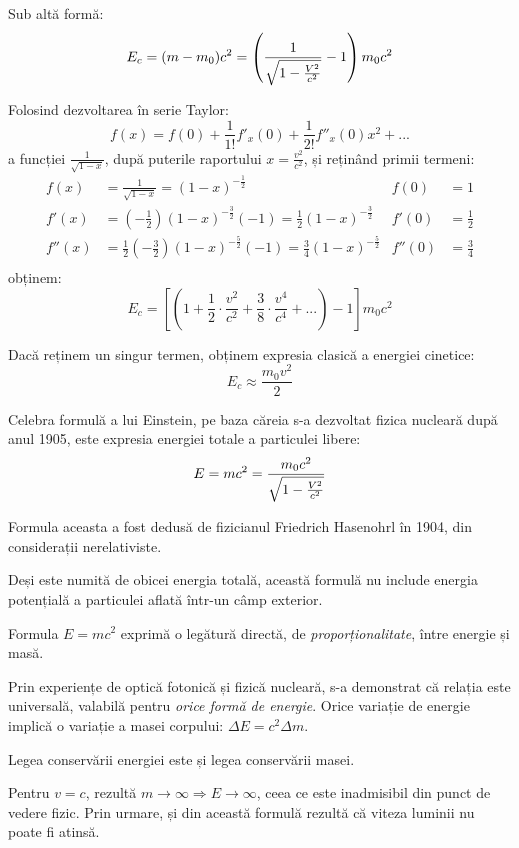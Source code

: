 Sub altă formă:
\[ E_c = (m - m_0) c^2 = \left( \frac{1}{\sqrt{1 - \frac{V^2}{c^2}}} - 1 \right) m_0c^2 \]

Folosind dezvoltarea în serie Taylor:
\[ f(x) = f(0) + \frac{1}{1!}f'_x(0) + \frac{1}{2!}f''_x(0) x^2 + ...\]
a funcției \( \frac{1}{\sqrt{1-x}} \), după puterile raportului \( x = \frac{v^2}{c^2} \),
și reținând primii termeni:
\begin{align*}
    f(x)   &= \frac{1}{\sqrt{1-x}} = (1 - x)^{-\frac{1}{2}}
           & f(0)   &= 1 \\
    f'(x)  &= \left(-\frac{1}{2}\right) (1 - x)^{-\frac{3}{2}}(-1) = \frac{1}{2}(1 - x)^{-\frac{3}{2}}
           & f'(0)  &= \frac{1}{2} \\
    f''(x) &= \frac{1}{2} \left(-\frac{3}{2}\right) (1 - x)^{-\frac{5}{2}}(-1) = \frac{3}{4}(1 - x)^{-\frac{5}{2}}
           & f''(0) &= \frac{3}{4} \\
\end{align*}
obținem:
\[ E_c = \left[ \left( 1 + \frac{1}{2}\cdot\frac{v^2}{c^2} + \frac{3}{8}\cdot\frac{v^4}{c^4} + ... \right) - 1 \right] m_0c^2 \]

Dacă reținem un singur termen, obținem expresia clasică a energiei cinetice:
\[ E_c \approx \frac{m_0v^2}{2} \]

Celebra formulă a lui Einstein, pe baza căreia s-a dezvoltat fizica nucleară
după anul 1905, este expresia energiei totale a particulei libere:
\[ E = mc^2 = \frac{m_0c^2}{\sqrt{1 - \frac{V^2}{c^2}}} \]

Formula aceasta a fost dedusă de fizicianul Friedrich Hasenohrl în 1904,
din considerații nerelativiste.

Deși este numită de obicei energia totală, această formulă nu include energia
potențială a particulei aflată într-un câmp exterior.

Formula \( E = mc^2 \) exprimă o legătură directă, de \emph{proporționalitate},
între energie și masă.

Prin experiențe de optică fotonică și fizică nucleară, s-a demonstrat că relația
este universală, valabilă pentru \emph{orice formă de energie}. Orice variație
de energie implică o variație a masei corpului: \( \Delta E = c^2 \Delta m \).

Legea conservării energiei este și legea conservării masei.

Pentru \( v = c \), rezultă \( m \rightarrow \infty \Rightarrow E \rightarrow \infty \),
ceea ce este inadmisibil din punct de vedere fizic. Prin urmare, și din această formulă
rezultă că viteza luminii nu poate fi atinsă.

